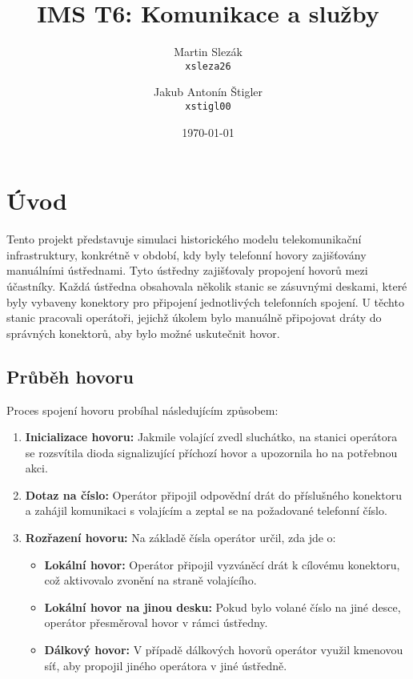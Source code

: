 \documentclass{article}
\title{IMS T6: Komunikace a služby}
\author{
    Martin Slezák\\
    \texttt{xsleza26}
    \and
    Jakub Antonín Štigler\\
    \texttt{xstigl00}
}
\date{\today}
\begin{document}
\maketitle

\newpage
\tableofcontents

\newpage
\section{Úvod}

Tento projekt představuje simulaci historického modelu telekomunikační
infrastruktury, konkrétně v období, kdy byly telefonní hovory zajišťovány
manuálními ústřednami. Tyto ústředny zajišťovaly propojení hovorů mezi
účastníky. Každá ústředna obsahovala několik stanic se zásuvnými deskami, které
byly vybaveny konektory pro připojení jednotlivých telefonních spojení. U
těchto stanic pracovali operátoři, jejichž úkolem bylo manuálně připojovat
dráty do správných konektorů, aby bylo možné uskutečnit hovor.

\subsection{Průběh hovoru}

Proces spojení hovoru probíhal následujícím způsobem:

\begin{enumerate}
    \item \textbf{Inicializace hovoru:} Jakmile volající zvedl sluchátko, na
        stanici operátora se rozsvítila dioda signalizující příchozí hovor a
        upozornila ho na potřebnou akci.
    \item \textbf{Dotaz na číslo:} Operátor připojil odpovědní drát do
        příslušného konektoru a zahájil komunikaci s volajícím a zeptal se na
        požadované telefonní číslo.
    \item \textbf{Rozřazení hovoru:} Na základě čísla operátor určil, zda jde
        o:
        \begin{itemize}
            \item \textbf{Lokální hovor:} Operátor připojil vyzváněcí drát k
                cílovému konektoru, což aktivovalo zvonění na straně
                volajícího.
            \item \textbf{Lokální hovor na jinou desku:} Pokud bylo volané
                číslo na jiné desce, operátor přesměroval hovor v rámci
                ústředny.
            \item \textbf{Dálkový hovor:} V případě dálkových hovorů
                operátor využil kmenovou síť, aby propojil jiného operátora v
                jiné ústředně.
        \end{itemize}
\end{enumerate}
\end{document}
